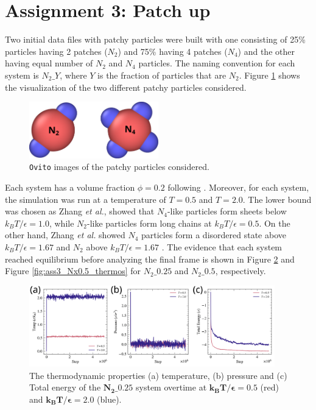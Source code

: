 \documentclass[10pt,a4paper]{labreport}
\begin{document}
\newpage
\section{Assignment 3: Patch up}
Two initial data files with patchy particles were built with one consisting of 25\% particles having 2 patches ($N_2$) and 75\% having 4 patches ($N_4$) and the other having equal number of $N_2$ and $N_4$ particles. The naming convention for each system is $N_2\_Y$, where $Y$ is the fraction of particles that are $N_2$. 
Figure \ref{fig:ass3_patchy_particles} shows the visualization of the two different patchy particles considered.
\begin{figure}[h]
  \centering
  \includegraphics[width = 0.5\textwidth]{figs/ass3_particles.png}
  \caption{\texttt{Ovito} images of the patchy particles considered.}
  \label{fig:ass3_patchy_particles}
\end{figure}



Each system has a volume fraction $\phi=0.2$ following \cite{zhangSelfAssemblyPatchyParticles2004}. Moreover, for each system, the simulation was run at a temperature of $T=0.5$ and $T=2.0$. The lower bound was chosen as Zhang \textit{et al.}, showed that $N_4$-like particles form sheets below $k_BT/\epsilon = 1.0$, while $N_2$-like particles form long chains at  $k_BT/\epsilon = 0.5$.  On the other hand, Zhang \textit{et al.} showed $N_4$ particles form a disordered state above $k_BT/\epsilon = 1.67$ and $N_2$ above $k_BT/\epsilon = 1.67$ \cite{zhangSelfAssemblyPatchyParticles2004}. 
The evidence that each system reached equilibrium before analyzing the final frame is shown in Figure \ref{fig:ass3_Nx0.25_thermos} and Figure \ref{fig:ass3_Nx0.5_thermos} for $N_2\_0.25$ and $N_2\_ 0.5$, respectively. 

\begin{figure}[htbp]
  \centering
  \includegraphics[width = 0.95\textwidth]{figs/ass3_Nx0.25_thermos.png}
  \caption{The thermodynamic properties (a) temperature, (b) pressure and (c) Total energy of the $\bm{N_2\_ 0.25}$ system overtime at $\bm{k_BT / \epsilon = 0.5}$ (red) and $\bm{k_BT/\epsilon = 2.0}$ (blue). } 
  \label{fig:ass3_Nx0.25_thermos}
\end{figure}
\end{document}
